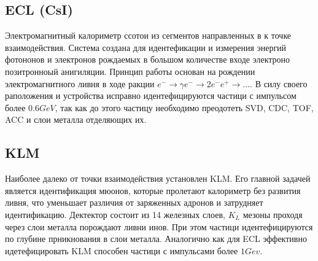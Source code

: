 \subsection{ECL (CsI)}

Электромагнитный калориметр ссотои из сегментов направленных в к точке взаимодействия. 
Система создана для идентефикации и измерения энергий фотононов и электронов 
рождаемых в большом количестве входе электроно позитронноый анигиляции. 
Принцип работы основан на рождении электромагнитного ливня в ходе ракции
$e^- \to \gamma e^- \to 2e^- e^+ \to ...$. В силу своего раположения и устройства 
исправно идентефицируются частици с импульсом более $0.6 GeV$, так как до этого частицу необходимо 
преодотеть SVD, CDC, TOF, ACC и слои металла отделяющих их.

\subsection{KLM}

Наиболее далеко от точки взаимодействия установлен KLM. Его главной задачей
является идентификация мюонов, которые пролетают калориметр без развития 
ливня, что уменьшает различия от заряженных адронов и затрудняет идентификацию.
Дектектор состоит из 14 железных слоев, $K_L$ мезоны проходя через слои металла
порождают ливни инов. При этом частици идентефицируются по глубине прникнования 
в слои металла. Аналогично как для ECL эффективно идетефицировать KLM способен 
частици с импульсами более $1 Gev$.





